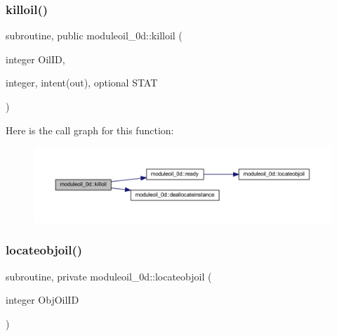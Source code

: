 \subsubsection{\texorpdfstring{killoil()}{killoil()}}
{\footnotesize\ttfamily subroutine, public moduleoil\+\_\+0d\+::killoil (\begin{DoxyParamCaption}\item[{integer}]{Oil\+ID,  }\item[{integer, intent(out), optional}]{S\+T\+AT }\end{DoxyParamCaption})}

Here is the call graph for this function\+:\nopagebreak
\begin{figure}[H]
\begin{center}
\leavevmode
\includegraphics[width=350pt]{namespacemoduleoil__0d_af1fa454b03e05f0047dd0b211f889b4b_cgraph}
\end{center}
\end{figure}
\mbox{\label{namespacemoduleoil__0d_a9c7229be13ce2cc83e0f461b6355f4fa}} 
\subsubsection{\texorpdfstring{locateobjoil()}{locateobjoil()}}
{\footnotesize\ttfamily subroutine, private moduleoil\+\_\+0d\+::locateobjoil (\begin{DoxyParamCaption}\item[{integer}]{Obj\+Oil\+ID }\end{DoxyParamCaption})\hspace{0.3cm}{\ttfamily [private]}}

